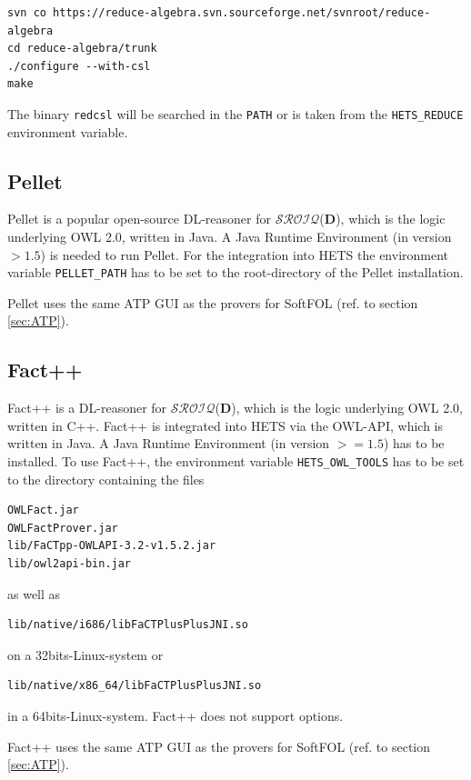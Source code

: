\documentclass{article}
\newcommand{\normalTEXTSC}[2]{{#1\scriptsize#2}}
\newcommand     {\Hets}{\normalTEXTSC{H}{ETS}\xspace}
\newcommand{\SROIQ}{$\mathcal{SROIQ}$(\textbf{D})\xspace}
\newcommand{\DL}{DL\xspace}
\begin{document}
\begin{verbatim}
svn co https://reduce-algebra.svn.sourceforge.net/svnroot/reduce-algebra
cd reduce-algebra/trunk
./configure --with-csl
make
\end{verbatim}

The binary \texttt{redcsl} will be searched in the \texttt{PATH} or is taken
from the \texttt{HETS\_REDUCE} environment variable.

\subsection{Pellet}
Pellet is a popular open-source \DL-reasoner for \SROIQ, which is the logic
underlying OWL 2.0, written in Java. A Java Runtime Environment (in version $> 1.5$)
is needed to run Pellet. For the integration into \Hets the environment variable
\verb+PELLET_PATH+ has to be set to the root-directory of the Pellet installation.

Pellet uses the same ATP GUI as the provers for SoftFOL (ref. to section
\ref{sec:ATP}).
\subsection{Fact++}
Fact++ is a \DL-reasoner for \SROIQ, which is the logic underlying OWL 2.0, written in
C++. Fact++ is integrated into \Hets via the OWL-API, which is written in Java.
A Java Runtime Environment (in version $>= 1.5$) has to be installed. To use Fact++,
the environment variable \verb+HETS_OWL_TOOLS+ has to be set to the directory
containing the files
\begin{verbatim}
OWLFact.jar
OWLFactProver.jar
lib/FaCTpp-OWLAPI-3.2-v1.5.2.jar
lib/owl2api-bin.jar
\end{verbatim}
as well as
\begin{verbatim}
lib/native/i686/libFaCTPlusPlusJNI.so
\end{verbatim}
on a 32bits-Linux-system or
\begin{verbatim}
lib/native/x86_64/libFaCTPlusPlusJNI.so
\end{verbatim}
in a 64bits-Linux-system. Fact++ does not support options.

Fact++ uses the same ATP GUI as the provers for SoftFOL (ref. to section
\ref{sec:ATP}).
\end{document}
